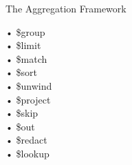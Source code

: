 \documentclass{beamer}
\begin{document}
\begin{frame}{The Aggregation Framework}

\begin{minipage}[t]{0.3\textwidth}
	\begin{Alms*}
	• \$group \\
	• \$limit \\
	• \$match \\
	• \$sort \\
	• \$unwind \\
	• \$project \\
	• \$skip \\
	• \$out \\
	• \$redact \\
	• \$lookup \\
	\end{Alms*}
\end{minipage}
\hfill
\begin{minipage}[t]{0.7\textwidth}
	
\end{minipage}

\end{frame}
\end{document}
